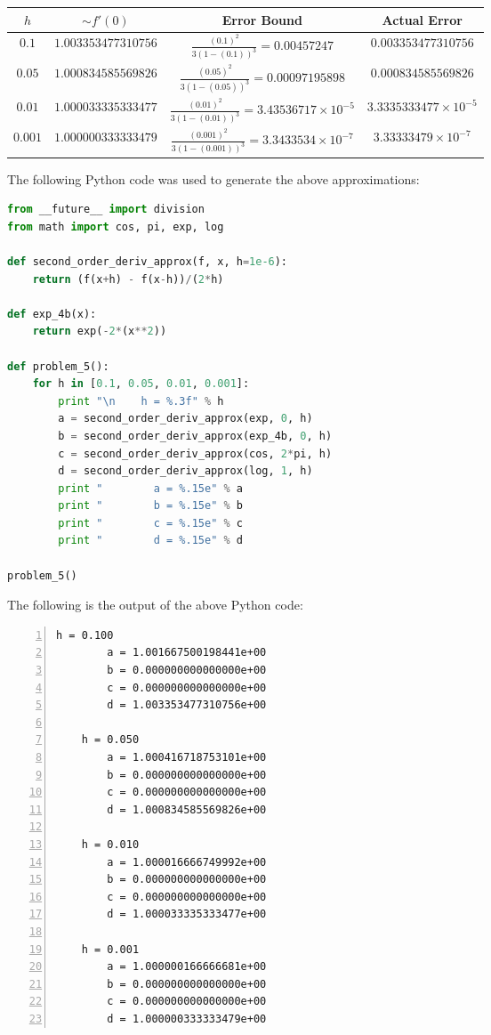 \documentclass[12pt]{article}
\begin{document}
\begin{enumerate}[\ \ (a)\ \ ]
    \begin{table}[H]
        \begin{tabular}{||c|c|c|c||} \hline\hline
            $h$ & $\sim f'(0)$ & {\bf Error Bound} & {\bf Actual Error} \\ \hline
            $0.1$ & $1.003353477310756$ & $\frac{(0.1)^2}{3(1 - (0.1))^3} = 0.00457247$ & $0.003353477310756$ \\ \hline
            $0.05$ & $1.000834585569826$ & $\frac{(0.05)^2}{3(1 - (0.05))^3} = 0.00097195898$ & $0.000834585569826$ \\ \hline
            $0.01$ & $1.000033335333477$ & $\frac{(0.01)^2}{3(1 - (0.01))^3} = 3.43536717 \times 10^{-5}$ & $3.3335333477 \times 10^{-5}$ \\ \hline
            $0.001$ & $1.000000333333479$ & $\frac{(0.001)^2}{3(1 - (0.001))^3} = 3.3433534 \times 10^{-7}$ & $3.33333479 \times 10^{-7}$ \\ \hline \hline
        \end{tabular}
    \end{table}

\end{enumerate}
The following Python code was used to generate the above approximations:
\begin{lstlisting}[language=Python, caption=Problem 3 source code]
from __future__ import division
from math import cos, pi, exp, log

def second_order_deriv_approx(f, x, h=1e-6):
    return (f(x+h) - f(x-h))/(2*h)

def exp_4b(x):
    return exp(-2*(x**2))

def problem_5():
    for h in [0.1, 0.05, 0.01, 0.001]:
        print "\n    h = %.3f" % h
        a = second_order_deriv_approx(exp, 0, h)
        b = second_order_deriv_approx(exp_4b, 0, h)
        c = second_order_deriv_approx(cos, 2*pi, h)
        d = second_order_deriv_approx(log, 1, h)
        print "        a = %.15e" % a
        print "        b = %.15e" % b
        print "        c = %.15e" % c
        print "        d = %.15e" % d

problem_5()
\end{lstlisting}
The following is the output of the above Python code:
\begin{Verbatim}[fontfamily=courier, numbers=left, numbersep=2pt, fontsize=\small]
    h = 0.100
        a = 1.001667500198441e+00
        b = 0.000000000000000e+00
        c = 0.000000000000000e+00
        d = 1.003353477310756e+00

    h = 0.050
        a = 1.000416718753101e+00
        b = 0.000000000000000e+00
        c = 0.000000000000000e+00
        d = 1.000834585569826e+00

    h = 0.010
        a = 1.000016666749992e+00
        b = 0.000000000000000e+00
        c = 0.000000000000000e+00
        d = 1.000033335333477e+00

    h = 0.001
        a = 1.000000166666681e+00
        b = 0.000000000000000e+00
        c = 0.000000000000000e+00
        d = 1.000000333333479e+00
\end{Verbatim}
\end{document}
